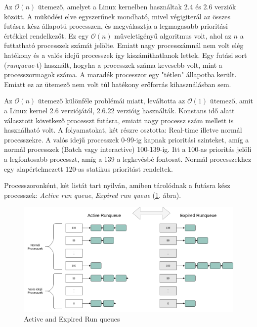 Az $\mathcal{O}(n)$ ütemező, amelyet a Linux kernelben használtak 2.4 és 2.6 verziók között. A müködési elve egyszerűnek mondható, mivel végigiterál az összes futásra kész állapotú processzen, és megválasztja a legmagasabb prioritási értékkel rendelkezőt.
Ez egy $\mathcal{O}(n)$ műveletigényű algoritmus volt, ahol az $n$ a futtatható processzek számát jelölte. Emiatt nagy processzámnál nem volt elég hatékony és a valós idejű processzek így kiszámíthatlanok lettek.
Egy futási sort (\textit{runqueue}-t) használt, hogyha a processzek száma kevesebb volt, mint a processzormagok száma. A maradék processzor egy "tétlen" állapotba került. Emiatt ez az ütemező nem volt túl hatékony erőforrás kihasználásban sem.


Az $\mathcal{O}(n)$ ütemező különféle problémái miatt, leváltotta az $\mathcal{O}(1)$ ütemező, amit a Linux kernel 2.6 verziójától, 2.6.22 verzióig használták. 
Konstans idő alatt választott következő processzt futásra, emiatt nagy processz szám mellett is használható volt.
A folyamatokat, két részre osztotta: Real-time illetve normál processzekre. A valós idejű processzek 0-99-ig kapnak prioritási szinteket, amíg a normál processzek (Batch vagy interactive) 100-139-ig. Itt a 100-as prioritás jelöli a legfontosabb processzt, amíg a 139 a legkevésbé fontosat. Normál processzekhez egy alapértelmezett 120-as statikus prioritást rendeltek. 

Processzoronként, két listát tart nyilván, amiben tárolódnak a futásra kész processzek: \textit{Active run queue}, \textit{Expired run queue} (\ref{fig:activeExpiredRunqueue}. ábra).

\begin{figure}[h]
\centering
\includegraphics[width=\textwidth]{images/activeExpiredRunqueue.png}
\caption{Active and Expired Run queues}
\label{fig:activeExpiredRunqueue}
\end{figure}

